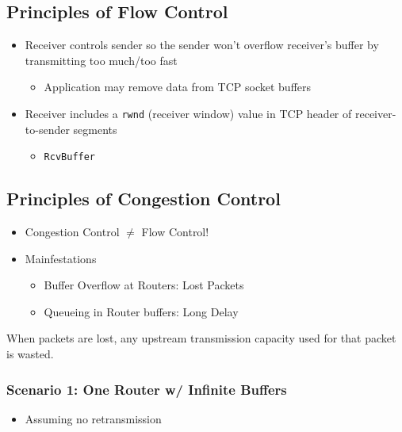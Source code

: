 \documentclass[a4paper]{article}
\begin{document}
\subsection{Principles of Flow Control}
\begin{itemize}
    \item Receiver controls sender so the sender won't overflow receiver's buffer by transmitting too much/too fast
    \begin{itemize}[label=$\circ$]
        \item Application may remove data from TCP socket buffers
    \end{itemize}
    \item Receiver includes a \texttt{rwnd} (receiver window) value in TCP header of receiver-to-sender segments
    \begin{itemize}[label=$\circ$]
        \item \texttt{RcvBuffer}
    \end{itemize}
\end{itemize}

\subsection{Principles of Congestion Control}
\begin{itemize}
    \item Congestion Control $\neq$ Flow Control!
    \item Mainfestations
    \begin{itemize}[label=$\circ$]
        \item Buffer Overflow at Routers: Lost Packets
        \item Queueing in Router buffers: Long Delay
    \end{itemize}
\end{itemize}
\noindent When packets are lost, any upstream transmission capacity used for that packet is wasted.

\subsubsection{Scenario 1: One Router w/ Infinite Buffers}
\begin{itemize}
    \item Assuming no retransmission
\end{itemize}
\end{document}

